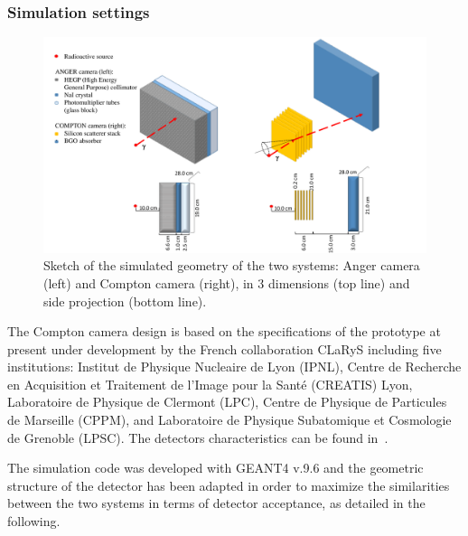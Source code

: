 \subsubsection{Simulation settings}\label{CC_settings}
\begin{figure}
  \centering
  \includegraphics[width=\linewidth]{03_GraphicFiles/chapter4/SPECT/schema}
  \caption{Sketch of the simulated geometry of the two systems: Anger camera (left) and Compton camera (right), in 3 dimensions (top line) and side projection (bottom line).}
  \label{fig:geometry_schema}
\end{figure}

The Compton camera design is based on the specifications of the prototype at present under development by the French collaboration CLaRyS including five institutions: Institut de Physique Nucleaire de Lyon (IPNL), Centre de Recherche en Acquisition et Traitement de l'Image pour la Santé (CREATIS) Lyon, Laboratoire de Physique de Clermont (LPC), Centre de Physique de Particules de Marseille (CPPM), and Laboratoire de Physique Subatomique et Cosmologie de Grenoble (LPSC). The detectors characteristics can be found in~\cite{Krimmer2015}.

The simulation code was developed with GEANT4 v.9.6 and the geometric structure of the detector has been adapted in order to maximize the similarities between the two systems in terms of detector acceptance, as detailed in the following.

